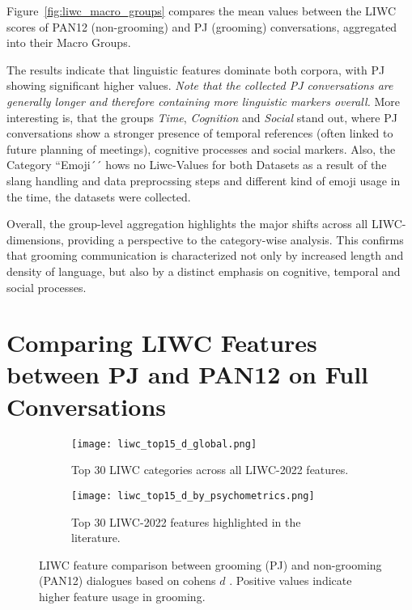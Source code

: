 Figure~\ref{fig:liwc_macro_groups} compares the mean values between the LIWC scores of PAN12 (non-grooming) and PJ (grooming) conversations, aggregated into their Macro Groups.

The results indicate that linguistic features dominate both corpora, with PJ showing significant higher values. \textit{Note that the collected PJ conversations are generally longer and therefore containing more linguistic markers overall.} More interesting is, that the groups \textit{Time}, \textit{Cognition} and \textit{Social} stand out, where PJ conversations show a stronger presence of temporal references (often linked to future planning of meetings), cognitive processes and social markers. Also, the Category ``Emoji´´ hows no Liwc-Values for both Datasets as a result of the slang handling and data preprocssing steps and different kind of emoji usage in the time, the datasets were collected.

Overall, the group-level aggregation highlights the major shifts across all LIWC-dimensions, providing a perspective to the category-wise analysis. This confirms that grooming communication is  characterized not only by increased length and density of language, but also by a distinct emphasis on cognitive, temporal and social processes.


\section{Comparing LIWC Features between PJ and PAN12 on Full Conversations} \label{sec:liwc_global_analysis}

\begin{figure}[ht]
    \centering
    \begin{subfigure}[t]{0.48\textwidth}
        \centering
        \texttt{[image: liwc\_top15\_d\_global.png]}
        \caption{Top 30 LIWC categories across all LIWC-2022 features.}
    \end{subfigure}
    \hfill
    \begin{subfigure}[t]{0.48\textwidth}
        \centering
        \texttt{[image: liwc\_top15\_d\_by\_psychometrics.png]}
        \caption{Top 30 LIWC-2022 features highlighted in the literature.}
    \end{subfigure}
    \caption[LIWC-Feature Comparison (PJ, PAN12) over Complete Conversations]{LIWC feature comparison between grooming (PJ) and non-grooming (PAN12) dialogues based on cohens $d$ \cite{cohen1988}. Positive values indicate higher feature usage in grooming.}
    \label{fig:liwc_global_analysis}
\end{figure}


